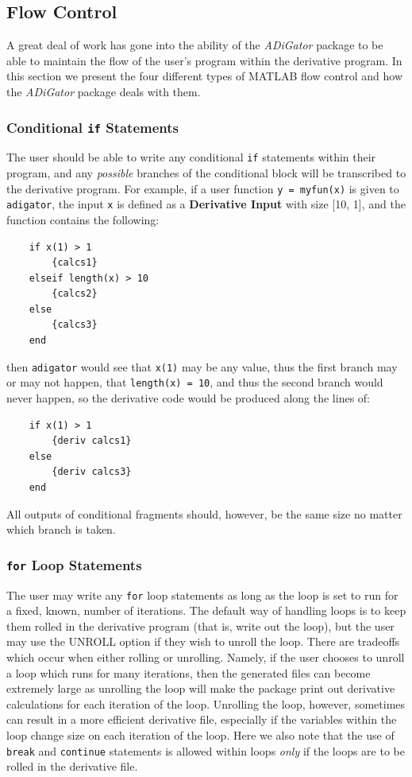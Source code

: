 \documentclass[10pt,pdftex]{article}
\begin{document}
\subsection{Flow Control}
A great deal of work has gone into the ability of the \emph{ADiGator} package to be able to maintain the flow of the user's program within the derivative program. In this section we present the four different types of MATLAB flow control and how the \emph{ADiGator} package deals with them.
\subsubsection{Conditional \texttt{if} Statements}
The user should be able to write any conditional \texttt{if} statements within their program, and any \emph{possible} branches of the conditional block will be transcribed to the derivative program. For example, if a user function \texttt{y = myfun(x)} is given to \texttt{adigator}, the input \texttt{x} is defined as a {\bf Derivative Input} with size [10, 1], and the function contains the following:
\begin{verbatim}
    if x(1) > 1
        {calcs1}
    elseif length(x) > 10
        {calcs2}
    else
        {calcs3}
    end
\end{verbatim} 
then \texttt{adigator} would see that \texttt{x(1)} may be any value, thus the first branch may or may not happen, that \texttt{length(x) = 10}, and thus the second branch would never happen, so the derivative code would be produced along the lines of:
\begin{verbatim}
    if x(1) > 1
        {deriv calcs1}
    else
        {deriv calcs3}
    end
\end{verbatim}
All outputs of conditional fragments should, however, be the same size no matter which branch is taken.
\subsubsection{\texttt{for} Loop Statements}
The user may write any \texttt{for} loop statements as long as the loop is set to run for a fixed, known, number of iterations. The default way of handling loops is to keep them rolled in the derivative program (that is, write out the loop), but the user may use the UNROLL option if they wish to unroll the loop. There are tradeoffs which occur when either rolling or unrolling. Namely, if the user chooses to unroll a loop which runs for many iterations, then the generated files can become extremely large as unrolling the loop will make the package print out derivative calculations for each iteration of the loop. Unrolling the loop, however, sometimes can result in a more efficient derivative file, especially if the variables within the loop change size on each iteration of the loop. Here we also note that the use of \texttt{break} and \texttt{continue} statements is allowed within loops \emph{only} if the loops are to be rolled in the derivative file.
\end{document}
